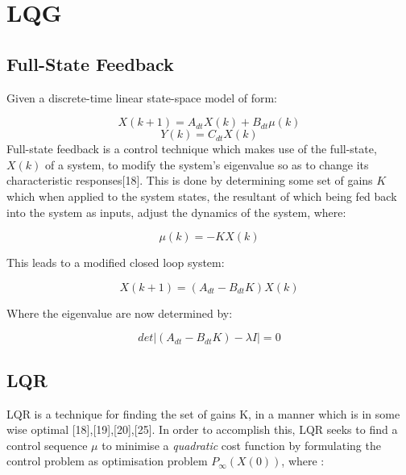 \documentclass[12pt,a4paper,twoside]{report}
\begin{document}
		\section{LQG}
		
			\subsection{Full-State Feedback}
			
				Given a discrete-time linear state-space model of form:
				
				\[X(k+1) = A_{dt}X(k) + B_{dt} \mu(k)\]
				\begin{equation}
					Y(k) = C_{dt} X(k)
				\end{equation}
				\space
				Full-state feedback is a control technique which makes use of the full-state, $X(k)$ of a system, to modify the system's eigenvalue so as to change its characteristic responses[18]. This is done by determining some set of gains $K$ which when applied to the system states, the resultant of which being fed back into the system as inputs, adjust the dynamics of the system, where:
				
				\begin{equation}
					\mu(k) = -K X(k)
				\end{equation}
				
				This leads to a modified closed loop system:
				
				\begin{equation}
					X(k+1) = (A_{dt}-B_{dt}K) X(k)
				\end{equation}
				
				Where the eigenvalue are now determined by:
				
				\begin{equation}
					det|(A_{dt}-B_{dt}K) - \lambda I| = 0
				\end{equation}
				
			\subsection{LQR}
				
				LQR is a technique for finding the set of gains K, in a manner which is in some wise optimal [18],[19],[20],[25]. In order to accomplish this, LQR seeks to find a control sequence \emph{\emph{$\mu$}} to minimise a \emph{quadratic} cost function by formulating the control problem as optimisation problem \(P_\infty(X(0))\), where :
				
\end{document}

